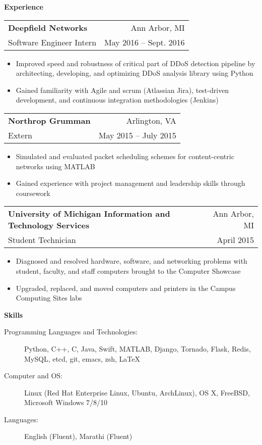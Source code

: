 \documentclass[letterpaper,11pt]{article}
\makeatletter
\newcommand{\resitem}[1]{\item #1 \vspace{-2pt}}
\newcommand{\resheading}[1]{{\large \colorbox{mygrey}{\begin{minipage}{\textwidth}{\textbf{#1 \vphantom{p\^{E}}}}\end{minipage}}}}
\newcommand{\ressubheading}[4]{
\begin{tabular*}{6.875in}{l@{\extracolsep{\fill}}r}
		\textbf{#1} & #2 \\
		#3 & #4 \\
\end{tabular*}\vspace{-6pt}}
\renewcommand{\footnotesize}{\fontsize{10pt}{11pt}\selectfont}
\makeatother
\begin{document}
		\resheading{Experience}
		\begin{description}
			\item 
			\ressubheading{Deepfield Networks}{Ann Arbor, MI}
			{Software Engineer Intern}{May 2016 -- Sept. 2016}
			{	
				\footnotesize
				\begin{itemize}
					\resitem{Improved speed and robustness of critical part of DDoS detection pipeline by architecting, developing, and optimizing DDoS analysis library using Python}
					\resitem{Gained familiarity with Agile and scrum (Atlassian Jira), test-driven development, and continuous integration methodologies (Jenkins)}
				\end{itemize}
			}
			\item 
			\ressubheading{Northrop Grumman}{Arlington, VA}
			{Extern}{May 2015 -- July 2015}
			{	
				\footnotesize
				\begin{itemize}
					\resitem{Simulated and evaluated packet scheduling schemes for content-centric networks using MATLAB}
					\resitem{Gained experience with project management and leadership skills through coursework}
				\end{itemize}
			}
			\item 
			\ressubheading{University of Michigan Information and Technology Services}{Ann Arbor, MI}
			{Student Technician}{April 2015}
			{	
				\footnotesize
				\begin{itemize}
					\resitem{Diagnosed and resolved hardware, software, and networking problems with student, faculty, and staff computers brought to the Computer Showcase}
					\resitem{Upgraded, replaced, and moved computers and printers in the Campus Computing Sites labs}
				\end{itemize}
			}
			
		\end{description}  %
		
		\resheading{Skills}
		\begin{description}
			\item[Programming Languages and Technologies:]
				{	
					\footnotesize
					Python, C++, C, Java, Swift, MATLAB, Django, Tornado, Flask, Redis, MySQL, etcd, git, emacs, zsh, \LaTeX
				}
			\item[Computer and OS:]
				{
					\footnotesize
					Linux (Red Hat Enterprise Linux, Ubuntu, ArchLinux), OS X, FreeBSD, Microsoft Windows 7/8/10
				}
			\item[Languages:]
				{
					\footnotesize
					English (Fluent), Marathi (Fluent)
				}
		\end{description} %
		
\end{document}
